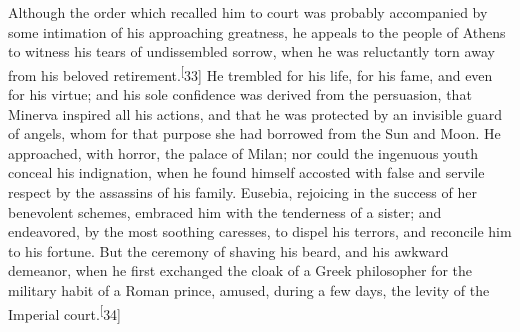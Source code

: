 


Although the order which recalled him to court was probably
accompanied by some intimation of his approaching greatness, he
appeals to the people of Athens to witness his tears of
undissembled sorrow, when he was reluctantly torn away from his
beloved retirement.\textsuperscript[33] He trembled for his life, for his fame,
and even for his virtue; and his sole confidence was derived from
the persuasion, that Minerva inspired all his actions, and that
he was protected by an invisible guard of angels, whom for that
purpose she had borrowed from the Sun and Moon. He approached,
with horror, the palace of Milan; nor could the ingenuous youth
conceal his indignation, when he found himself accosted with
false and servile respect by the assassins of his family.
Eusebia, rejoicing in the success of her benevolent schemes,
embraced him with the tenderness of a sister; and endeavored, by
the most soothing caresses, to dispel his terrors, and reconcile
him to his fortune. But the ceremony of shaving his beard, and
his awkward demeanor, when he first exchanged the cloak of a
Greek philosopher for the military habit of a Roman prince,
amused, during a few days, the levity of the Imperial court.\textsuperscript[34]



